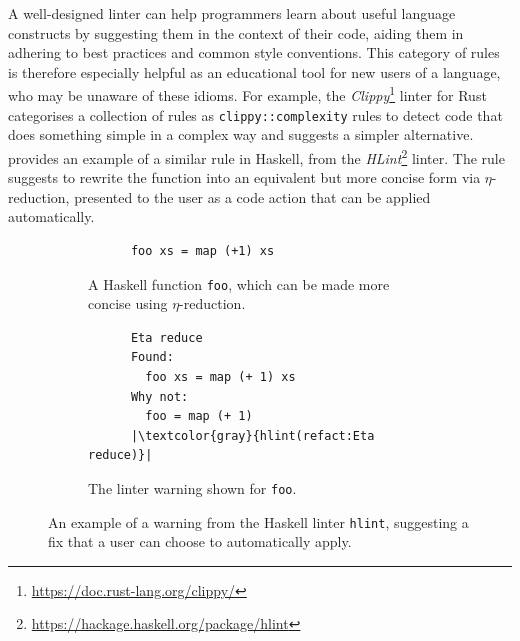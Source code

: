 \documentclass[../../main.tex]{subfiles}
\begin{document}
A well-designed linter can help programmers learn about useful language constructs by suggesting them in the context of their code, aiding them in adhering to best practices and common style conventions.
This category of rules is therefore especially helpful as an educational tool for new users of a language, who may be unaware of these idioms.
For example, the \emph{Clippy}\footnote{\url{https://doc.rust-lang.org/clippy/}} linter for Rust~\cite{li_clippy_2023} categorises a collection of rules as \texttt{clippy::complexity} rules to detect code that does something simple in a complex way and suggests a simpler alternative.
 provides an example of a similar rule in Haskell, from the \textit{HLint}\footnote{\url{https://hackage.haskell.org/package/hlint}} linter.
The rule suggests to rewrite the function into an equivalent but more concise form via $\eta$-reduction, presented to the user as a code action that can be applied automatically.

\begin{figure}[htbp]
  \vspace{3ex}
  \centering
  \begin{subfigure}{0.45\textwidth}
    \centering
    \begin{verbatim}
      foo xs = map (+1) xs
    \end{verbatim}
    \caption{A Haskell function \texttt{foo}, which can be made more concise using $\eta$-reduction.}
  \end{subfigure}
  \hfill
  \begin{subfigure}{0.45\textwidth}
    \centering
    \begin{verbatim}
      Eta reduce
      Found:
        foo xs = map (+ 1) xs
      Why not:
        foo = map (+ 1)
      |\textcolor{gray}{hlint(refact:Eta reduce)}|
    \end{verbatim}
    \caption{The linter warning shown for \texttt{foo}.}
  \end{subfigure}
  \caption{An example of a warning from the Haskell linter \texttt{hlint}, suggesting a fix that a user can choose to automatically apply.}
  \label{fig:hlint-example}
\end{figure}
\end{document}
